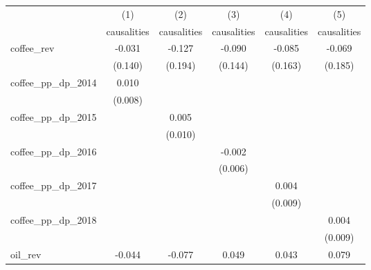 {
\def\sym#1{\ifmmode^{#1}\else\(^{#1}\)\fi}
\begin{tabular}{l*{5}{c}}
\hline\hline
            &\multicolumn{1}{c}{(1)}&\multicolumn{1}{c}{(2)}&\multicolumn{1}{c}{(3)}&\multicolumn{1}{c}{(4)}&\multicolumn{1}{c}{(5)}\\
            &\multicolumn{1}{c}{causalities}&\multicolumn{1}{c}{causalities}&\multicolumn{1}{c}{causalities}&\multicolumn{1}{c}{causalities}&\multicolumn{1}{c}{causalities}\\
\hline
coffee\_rev  &      -0.031         &      -0.127         &      -0.090         &      -0.085         &      -0.069         \\
            &     (0.140)         &     (0.194)         &     (0.144)         &     (0.163)         &     (0.185)         \\
[1em]
coffee\_pp\_dp\_2014&       0.010         &                     &                     &                     &                     \\
            &     (0.008)         &                     &                     &                     &                     \\
[1em]
coffee\_pp\_dp\_2015&                     &       0.005         &                     &                     &                     \\
            &                     &     (0.010)         &                     &                     &                     \\
[1em]
coffee\_pp\_dp\_2016&                     &                     &      -0.002         &                     &                     \\
            &                     &                     &     (0.006)         &                     &                     \\
[1em]
coffee\_pp\_dp\_2017&                     &                     &                     &       0.004         &                     \\
            &                     &                     &                     &     (0.009)         &                     \\
[1em]
coffee\_pp\_dp\_2018&                     &                     &                     &                     &       0.004         \\
            &                     &                     &                     &                     &     (0.009)         \\
[1em]
oil\_rev     &      -0.044         &      -0.077         &       0.049         &       0.043         &       0.079         \\

\end{tabular}}
